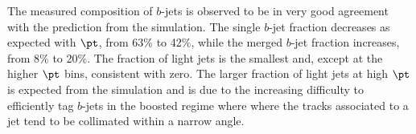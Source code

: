 The measured composition of $b$-jets is observed to be in very good agreement with the prediction from the simulation. The single $b$-jet fraction decreases as expected with $\pt$, from 63\% to 42\%, while the merged $b$-jet fraction increases, from 8\% to 20\%. The fraction of light jets is the smallest and, except at the higher $\pt$ bins, consistent with zero. The larger fraction of light jets at high $\pt$ is expected from the simulation and is due to the increasing difficulty to efficiently tag $b$-jets in the boosted regime where where the tracks associated to a jet tend to be collimated within a narrow angle.



